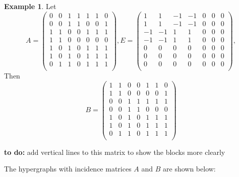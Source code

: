 \documentclass[11pt]{article}
\theoremstyle{definition}
\newtheorem{example}{Example}
\theoremstyle{remark}
\begin{document}
\begin{example}\cite[Example 4.9]{Kirkland}
Let
$$A = 
\begin{pmatrix}
0 & 0 & 1 & 1 & 1 & 1 & 0 \\
0 & 0 & 1 & 1 & 0 & 0 & 1 \\ \hline
1 & 1 & 0 & 0 & 1 & 1 & 1 \\
1 & 1 & 0 & 0 & 0 & 0 & 0 \\ \hline
1 & 0 & 1 & 0 & 1 & 1 & 1 \\
1 & 0 & 1 & 0 & 1 & 1 & 1 \\
0 & 1 & 1 & 0 & 1 & 1 & 1 \\
\end{pmatrix}, E = 
\begin{pmatrix}
1 & 1 & -1 & -1 & 0 & 0 & 0 \\
1 & 1 & -1 & -1 & 0 & 0 & 0 \\ \hline
-1 & -1 & 1 & 1 & 0 & 0 & 0 \\
-1 & -1 & 1 & 1 & 0 & 0 & 0 \\ \hline
0 & 0 & 0 & 0 & 0 & 0 & 0 \\
0 & 0 & 0 & 0 & 0 & 0 & 0 \\
0 & 0 & 0 & 0 & 0 & 0 & 0 \\
\end{pmatrix}, 
$$
Then 
$$B = \begin{pmatrix}
1 & 1 & 0 & 0 & 1 & 1 & 0 \\
1 & 1 & 0 & 0 & 0 & 0 & 1 \\ \hline
0 & 0 & 1 &1 & 1 & 1 & 1 \\
0 & 0 & 1 & 1 & 0 & 0 & 0 \\ \hline
1 & 0 & 1 & 0 & 1 & 1 & 1 \\
1 & 0 & 1 & 0 & 1 & 1 & 1 \\
0 & 1 & 1 & 0 & 1 & 1 & 1 \\
\end{pmatrix}$$



{\bf to do:} add vertical lines to this matrix to show the blocks more clearly

The hypergraphs with incidence matrices $A$ and $B$ are shown below:


\end{example}
\end{document}
